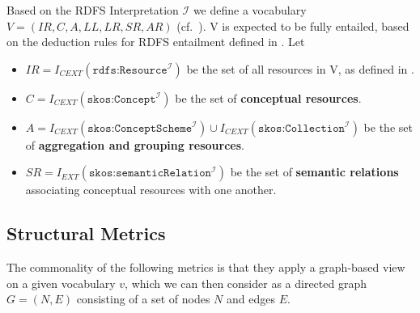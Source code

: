 \begin{definition} Based on the RDFS Interpretation $\mathcal{I}$ we define a vocabulary $V = (IR, C, A, LL, LR, SR, AR)$ (cf.~\cite{Hitzler2009}). V is expected to be fully entailed, based on the deduction rules for RDFS entailment defined in \cite{RDFSEM2012}. Let

\begin{itemize}
	\item \(IR = I_{CEXT}(\texttt{rdfs:Resource}^\mathcal{I})\) be the set of all resources in V, as defined in \cite{RDFSEM2012}.

	\item \(C = I_{CEXT}(\texttt{skos:Concept}^\mathcal{I})\) be the set of \textbf{conceptual resources}.

  \item \(A = I_{CEXT}(\texttt{skos:ConceptScheme}^\mathcal{I}) \cup I_{CEXT}(\texttt{skos:Collection}^\mathcal{I})\) be the set of \textbf{aggregation and grouping resources}.


	\item \(SR = I_{EXT}(\texttt{skos:semanticRelation}^\mathcal{I})\) be the set of \textbf{semantic relations} associating conceptual resources with one another.

\end{itemize}

\end{definition}

\subsection{Structural Metrics}

The commonality of the following metrics is that they apply a graph-based view on a given vocabulary \(v\), which we can then consider as a directed graph \(G=(N,E)\) consisting of a set of nodes \(N\) and edges \(E\).

